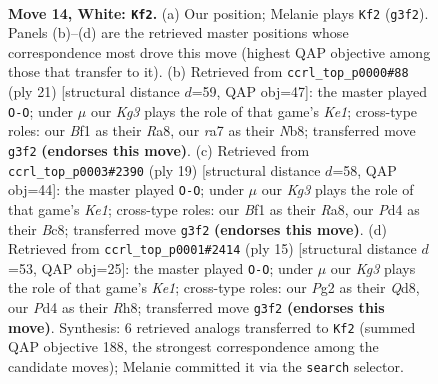 \documentclass[11pt]{article}
\begin{document}
\begin{figure}[p]
\label{fig:thought-m24}
\end{figure}

\clearpage

\begin{figure}[p]\centering
\begin{subfigure}{0.46\textwidth}\centering
\resizebox{\linewidth}{!}{%
\newchessgame
\chessboard[
  setfen={2b1qrk1/rppnnppp/4p3/p2pP3/3P1P2/2N3K1/PPP3PP/R2Q1BNR w - - 0 14},
  showmover=false,
  pgfstyle=straightmove, color=movearrow, markmove={g3-f2}
]}
\caption{}
\end{subfigure}\hfill
\begin{subfigure}{0.46\textwidth}\centering
\resizebox{\linewidth}{!}{%
\newchessgame
\chessboard[
  setfen={rn2k2r/1p1qbpp1/p6p/2ppP3/P3nN2/5N2/1PPP2PP/R1BQ1RK1 b kq - 1 11},
  showmover=false,
  pgfstyle=straightmove, color=movearrow, markmove={e8-g8}
]}
\caption{}
\end{subfigure}
\\[4pt]
\begin{subfigure}{0.46\textwidth}\centering
\resizebox{\linewidth}{!}{%
\newchessgame
\chessboard[
  setfen={r1bqk2r/p2pppbp/2p1n1p1/2p1P3/N7/1P3N2/P1PP1PPP/R1BQR1K1 b kq - 0 10},
  showmover=false,
  pgfstyle=straightmove, color=movearrow, markmove={e8-g8}
]}
\caption{}
\end{subfigure}\hfill
\begin{subfigure}{0.46\textwidth}\centering
\resizebox{\linewidth}{!}{%
\newchessgame
\chessboard[
  setfen={r1bqk2r/p2pppbp/2p3p1/2pnP3/8/3P1N1P/PPP2PP1/RNBQ1RK1 b kq - 0 8},
  showmover=false,
  pgfstyle=straightmove, color=movearrow, markmove={e8-g8}
]}
\caption{}
\end{subfigure}
\caption{\textbf{Move 14, White: \texttt{Kf2}.} (a) Our position; Melanie plays \texttt{Kf2} (\texttt{g3f2}). Panels (b)--(d) are the retrieved master positions whose correspondence most drove this move (highest QAP objective among those that transfer to it). (b) Retrieved from \texttt{ccrl\_top\_p0000\#88} (ply 21) [structural distance $d$=59, QAP obj=47]: the master played \texttt{O-O}; under $\mu$ our \emph{Kg3} plays the role of that game's \emph{Ke1}; cross-type roles: our \emph{B}f1 as their \emph{R}a8, our \emph{r}a7 as their \emph{N}b8; transferred move \texttt{g3f2} \textbf{(endorses this move)}. (c) Retrieved from \texttt{ccrl\_top\_p0003\#2390} (ply 19) [structural distance $d$=58, QAP obj=44]: the master played \texttt{O-O}; under $\mu$ our \emph{Kg3} plays the role of that game's \emph{Ke1}; cross-type roles: our \emph{B}f1 as their \emph{R}a8, our \emph{P}d4 as their \emph{B}c8; transferred move \texttt{g3f2} \textbf{(endorses this move)}. (d) Retrieved from \texttt{ccrl\_top\_p0001\#2414} (ply 15) [structural distance $d$=53, QAP obj=25]: the master played \texttt{O-O}; under $\mu$ our \emph{Kg3} plays the role of that game's \emph{Ke1}; cross-type roles: our \emph{P}g2 as their \emph{Q}d8, our \emph{P}d4 as their \emph{R}h8; transferred move \texttt{g3f2} \textbf{(endorses this move)}. Synthesis: 6 retrieved analogs transferred to \texttt{Kf2} (summed QAP objective 188, the strongest correspondence among the candidate moves); Melanie committed it via the \texttt{search} selector.}

\end{figure}
\end{document}
